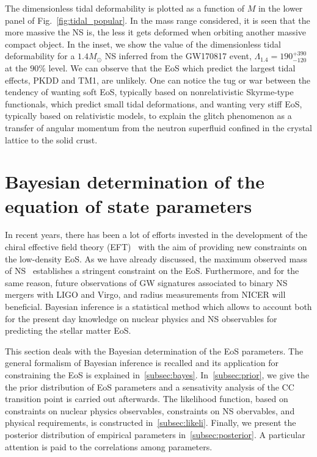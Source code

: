 The dimensionless tidal deformability is plotted as a function of $M$ in the 
lower panel of Fig.~\ref{fig:tidal_popular}. In the mass range considered, it 
is seen that the more massive the NS is, the less it gets deformed when 
orbiting another massive compact object. In the inset, we show the value of
the dimensionless tidal deformability for a $1.4M_\odot$ NS inferred from the 
GW170817 event, $\Lambda_{1.4} = 190_{-120}^{+390}$ at the $90\%$ level. We can
observe that the EoS which predict the largest tidal effects, PKDD and TM1, are 
unlikely. One can notice the tug or war between the tendency of wanting soft 
EoS, typically based on nonrelativistic Skyrme-type functionals, which predict 
small tidal deformations, and wanting very stiff EoS, typically based on 
relativistic models, to explain the glitch phenomenon as a transfer of angular
momentum from the neutron superfluid confined in the crystal lattice to the 
solid crust.

\section{Bayesian determination of the equation of state parameters}

In recent years, there has been a lot of efforts invested in the development of
the chiral effective field theory (EFT)~\cite{Drischler2016} with the aim of 
providing new constraints on the low-density EoS. As we have already discussed, 
the maximum observed mass of NS~\cite{Antoniadis2013,Cromartie2020} establishes 
a stringent constraint on the EoS. Furthermore, and for the same
reason, future observations of GW signatures associated to binary NS mergers 
with LIGO and Virgo, and radius measurements from NICER will beneficial.
Bayesian inference is a statistical method which allows to account both for the 
present day knowledge on nuclear physics and NS observables for predicting the 
stellar matter EoS.

This section deals with the Bayesian determination of the EoS
parameters. The general formalism of Bayesian inference is recalled and its
application for constraining the EoS is explained in~\ref{subsec:bayes}.
In~\ref{subsec:prior}, we give the the prior distribution of EoS parameters
and a sensativity analysis of the CC transition point is carried out 
afterwards. The likelihood function, based on constraints on nuclear physics
observables, constraints on NS obervables, and physical requirements, is 
constructed in~\ref{subsec:likeli}. Finally, we present the posterior 
distribution of empirical parameters in~\ref{subsec:posterior}. A particular 
attention is paid to the correlations among parameters.

